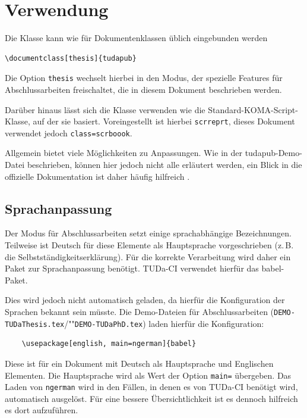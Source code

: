 \documentclass[
	ngerman,
	ruledheaders=chapter,%
	class=book,%
	thesis={
		type=dr,
		dr=rernat
	},
	accentcolor=9c,%
	custommargins=true,%
	marginpar=false,%
	fontsize=11pt,%
]{tudapub}
\let\file\texttt
\let\code\texttt
\begin{document}
\begin{abstract}
	Deutsche Zusammenfassung
\end{abstract}

\begin{abstract}[english]
	Englische Zusammenfassung, falls benötigt
\end{abstract}

\tableofcontents


\mainmatter



\chapter{Verwendung}
Die Klasse kann wie für Dokumentenklassen üblich eingebunden werden
\begin{verbatim}
\documentclass[thesis]{tudapub}
\end{verbatim}
Die Option \code{thesis} wechselt hierbei in den Modus, der spezielle Features für Abschlussarbeiten freischaltet, die in diesem Dokument beschrieben werden.

Darüber hinaus lässt sich die Klasse verwenden wie die Standard-KOMA-Script-Klasse, auf der sie basiert.
Voreingestellt ist hierbei \code{scrreprt}, dieses Dokument verwendet jedoch \code{class=scrboook}.

Allgemein bietet \KOMAScript{} viele Möglichkeiten zu Anpassungen. Wie in der tudapub-Demo-Datei beschrieben, können hier jedoch nicht alle erläutert werden, ein Blick in die offizielle Dokumentation ist daher häufig hilfreich \cite{scrguide}.

\section{Sprachanpassung}
Der Modus für Abschlussarbeiten setzt einige sprachabhängige Bezeichnungen.
Teilweise ist Deutsch für diese Elemente als Hauptsprache vorgeschrieben (z.\,B. die Selbstständigkeitserklärung). Für die korrekte Verarbeitung wird daher ein Paket zur Sprachanpassung benötigt.
TUDa-CI verwendet hierfür das babel-Paket.

Dies wird jedoch nicht automatisch geladen, da hierfür die Konfiguration der Sprachen bekannt sein müsste. Die Demo-Dateien für Abschlussarbeiten (\file{DEMO-TUDaThesis.tex}/""\file{DEMO-TUDaPhD.tex}) laden hierfür die Konfiguration:
\begin{verbatim}
	\usepackage[english, main=ngerman]{babel}
\end{verbatim}
Diese ist für ein Dokument mit Deutsch als Hauptsprache und Englischen Elementen.
Die Hauptsprache wird als Wert der Option \verb+main=+ übergeben.
Das Laden von \verb+ngerman+ wird in den Fällen, in denen es von TUDa-CI benötigt wird, automatisch ausgelöst.
Für eine bessere Übersichtlichkeit ist es dennoch hilfreich es dort aufzuführen.
\end{document}
